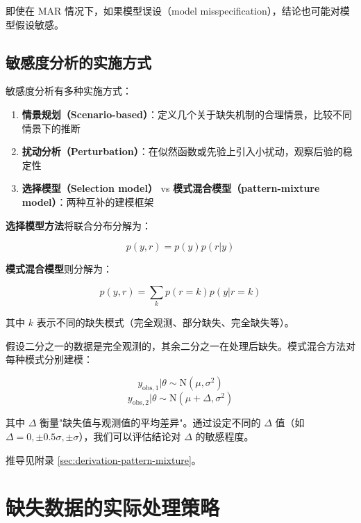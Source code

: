 即使在 MAR 情况下，如果模型误设（model misspecification），结论也可能对模型假设敏感。

\subsection{敏感度分析的实施方式}
\label{sec:sensitivity-methods}

敏感度分析有多种实施方式：

\begin{enumerate}
  \item \textbf{情景规划（Scenario-based）}：定义几个关于缺失机制的合理情景，比较不同情景下的推断
  \item \textbf{扰动分析（Perturbation）}：在似然函数或先验上引入小扰动，观察后验的稳定性
  \item \textbf{选择模型（Selection model）} vs \textbf{模式混合模型（pattern-mixture model）}：两种互补的建模框架
\end{enumerate}

\textbf{选择模型方法}将联合分布分解为：

\[
p(y, r) = p(y) p(r | y)
\label{eq:selection-model}
\]

\textbf{模式混合模型}则分解为：

\[
p(y, r) = \sum_{k} p(r = k) p(y | r = k)
\label{eq:pattern-mixture-model}
\]

其中 $k$ 表示不同的缺失模式（完全观测、部分缺失、完全缺失等）。

\begin{Example}\label{ex:pattern-mixture-sensitivity}
  假设二分之一的数据是完全观测的，其余二分之一在处理后缺失。模式混合方法对每种模式分别建模：

  \[
  y_{\text{obs},1} | \theta \sim \mathrm{N}(\mu, \sigma^2)
  \label{eq:pattern-mixture-complete}
  \]
  \[
  y_{\text{obs},2} | \theta \sim \mathrm{N}(\mu + \Delta, \sigma^2)
  \label{eq:pattern-mixture-missing}
  \]

  其中 $\Delta$ 衡量"缺失值与观测值的平均差异"。通过设定不同的 $\Delta$ 值（如 $\Delta = 0, \pm 0.5\sigma, \pm \sigma$），我们可以评估结论对 $\Delta$ 的敏感程度。
\end{Example}
推导见附录 \cref{sec:derivation-pattern-mixture}。

\section{缺失数据的实际处理策略}
\label{sec:practical-strategies}

